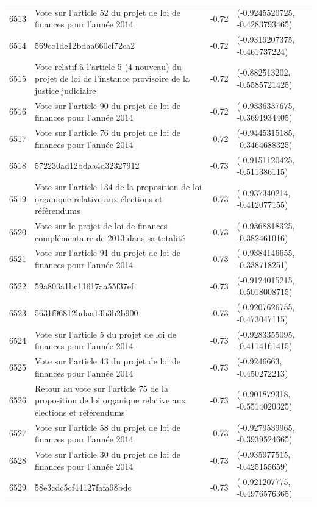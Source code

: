 \begin{table}[ht]
\begin{tabular}{rlrl}
  6513 & Vote sur l'article 52 du projet de loi de finances pour l'année 2014 & -0.72 & (-0.9245520725, -0.4283793465) \\ 
  6514 & 569cc1de12bdaa660cf72ca2 & -0.72 & (-0.9319207375, -0.461737224) \\ 
  6515 & Vote relatif à l'article 5 (4 nouveau) du projet de loi de l'instance provisoire de la justice judiciaire & -0.72 & (-0.882513202, -0.5585721425) \\ 
  6516 & Vote sur l'article 90 du projet de loi de finances pour l'année 2014 & -0.72 & (-0.9336337675, -0.3691934405) \\ 
  6517 & Vote sur l'article 76 du projet de loi de finances pour l'année 2014 & -0.72 & (-0.9445315185, -0.3464688325) \\ 
  6518 & 572230ad12bdaa4d32327912 & -0.73 & (-0.9151120425, -0.511386115) \\ 
  6519 & Vote sur l'article 134 de la proposition de loi organique relative aux élections et référendums & -0.73 & (-0.937340214, -0.412077155) \\ 
  6520 & Vote sur le projet de loi de finances complémentaire de 2013 dans sa totalité & -0.73 & (-0.9368818325, -0.382461016) \\ 
  6521 & Vote sur l'article 91 du projet de loi de finances pour l'année 2014 & -0.73 & (-0.9384146655, -0.338718251) \\ 
  6522 & 59a803a1bc11617aa55f37ef & -0.73 & (-0.9124015215, -0.5018008715) \\ 
  6523 & 5631f96812bdaa13b3b2b900 & -0.73 & (-0.9207626755, -0.473047115) \\ 
  6524 & Vote sur l'article 5 du projet de loi de finances pour l'année 2014 & -0.73 & (-0.9283355095, -0.4114161415) \\ 
  6525 & Vote sur l'article 43 du projet de loi de finances pour l'année 2014 & -0.73 & (-0.9246663, -0.450272213) \\ 
  6526 & Retour au vote sur l'article 75 de la proposition de loi organique relative aux élections et référendums & -0.73 & (-0.901879318, -0.5514020325) \\ 
  6527 & Vote sur l'article 58 du projet de loi de finances pour l'année 2014 & -0.73 & (-0.9279539965, -0.3939524665) \\ 
  6528 & Vote sur l'article 30 du projet de loi de finances pour l'année 2014 & -0.73 & (-0.935977515, -0.425155659) \\ 
  6529 & 58e3cdc5cf44127fafa98bdc & -0.73 & (-0.921207775, -0.4976576365) \\ 

\end{tabular}
\end{table}
